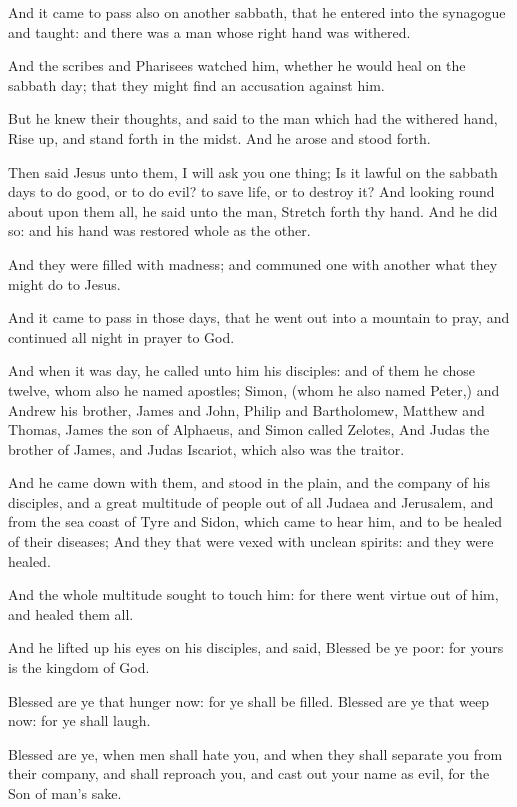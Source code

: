 \Verse And it came to pass also on another sabbath, that he entered into the synagogue and taught: and there was a man whose right hand was withered.

\Verse And the scribes and Pharisees watched him, whether he would heal on the sabbath day; that they might find an accusation against him.

\Verse But he knew their thoughts, and said to the man which had the withered hand, Rise up, and stand forth in the midst. And he arose and stood forth.

\Verse Then said Jesus unto them, I will ask you one thing; Is it lawful on the sabbath days to do good, or to do evil? to save life, or to destroy it?  \Verse And looking round about upon them all, he said unto the man, Stretch forth thy hand. And he did so: and his hand was restored whole as the other.

\Verse And they were filled with madness; and communed one with another what they might do to Jesus.

\Verse And it came to pass in those days, that he went out into a mountain to pray, and continued all night in prayer to God.

\Verse And when it was day, he called unto him his disciples: and of them he chose twelve, whom also he named apostles; \Verse Simon, (whom he also named Peter,) and Andrew his brother, James and John, Philip and Bartholomew, \Verse Matthew and Thomas, James the son of Alphaeus, and Simon called Zelotes, \Verse And Judas the brother of James, and Judas Iscariot, which also was the traitor.

\Verse And he came down with them, and stood in the plain, and the company of his disciples, and a great multitude of people out of all Judaea and Jerusalem, and from the sea coast of Tyre and Sidon, which came to hear him, and to be healed of their diseases; \Verse And they that were vexed with unclean spirits: and they were healed.

\Verse And the whole multitude sought to touch him: for there went virtue out of him, and healed them all.

\Verse And he lifted up his eyes on his disciples, and said, Blessed be ye poor: for yours is the kingdom of God.

\Verse Blessed are ye that hunger now: for ye shall be filled. Blessed are ye that weep now: for ye shall laugh.

\Verse Blessed are ye, when men shall hate you, and when they shall separate you from their company, and shall reproach you, and cast out your name as evil, for the Son of man's sake.


